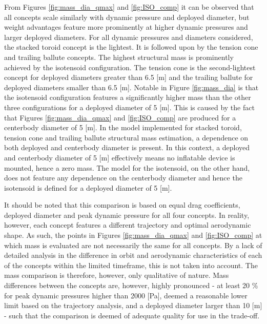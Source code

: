 From Figures \ref{fig:mass_dia_qmax} and \ref{fig:ISO_comp} it can be observed that all concepts scale similarly with dynamic pressure and deployed diameter, but weight advantages feature more prominently at higher dynamic pressures and larger deployed diameters. For all dynamic pressures and diameters considered, the stacked toroid concept is the lightest. It is followed upon by the tension cone and trailing ballute concepts. The highest structural mass is prominently achieved by the isotensoid configuration. The tension cone is the second-lightest concept for deployed diameters greater than 6.5 [m] and the trailing ballute for deployed diameters smaller than 6.5 [m]. Notable in Figure \ref{fig:mass_dia} is that the isotensoid configuration features a significantly higher mass than the other three configurations for a deployed diameter of 5 [m]. This is caused by the fact that Figures \ref{fig:mass_dia_qmax} and \ref{fig:ISO_comp} are produced for a centerbody diameter of 5 [m]. In the model implemented for stacked toroid, tension cone and trailing ballute \cite{Samareh2011} structural mass estimation, a dependence on both deployed and centerbody diameter is present. In this context, a deployed and centerbody diameter of 5 [m] effectively means no inflatable device is mounted, hence a zero mass. The model for the isotensoid, on the other hand, \cite{Anderson1969} does not feature any dependence on the centerbody diameter and hence the isotensoid is defined for a deployed diameter of 5 [m].

It should be noted that this comparison is based on equal drag coefficients, deployed diameter and peak dynamic pressure for all four concepts. In reality, however, each concept features a different trajectory and optimal aerodynamic shape. As such, the points in Figures \ref{fig:mass_dia_qmax} and \ref{fig:ISO_comp} at which mass is evaluated are not necessarily the same for all concepts. By a lack of detailed analysis in the difference in orbit and aerodynamic characteristics of each of the concepts within the limited timeframe, this is not taken into account. The mass comparison is therefore, however, only qualitative of nature. Mass differences between the concepts are, however, highly pronounced - at least 20 $\%$ for peak dynamic pressures higher than 2000 [Pa], deemed a reasonable lower limit based on the trajectory analysis, and a deployed diameter larger than 10 [m] - such that the comparison is deemed of adequate quality for use in the trade-off.



